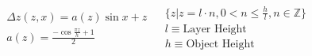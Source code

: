 \documentclass[border={1pt 1pt 1pt 1pt}]{standalone}
\begin{document}
$
	\begin{array}{c|c}
		\begin{matrix}
			\Delta z(z,x)=a(z)\sin{x} + z\\
			a(z) = \frac{-\cos{\frac{\pi z}{h}}+1}{2}\\
		\end{matrix}
		&
		\begin{matrix}
			\{z|z=l\cdot n, 0 < n \leq \frac{h}{l}, n\in \mathbb{Z}\}\\
			l \equiv \text{Layer Height}\\
			h \equiv \text{Object Height}\\
		\end{matrix}
	\end{array}
$
\end{document}
